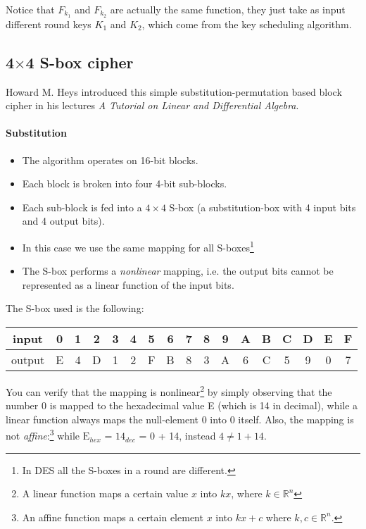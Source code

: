 \documentclass{article}
\begin{document}
  Notice that $F_{k_{1}}$ and $F_{k_{2}}$ are actually the same
  function, they just take as input different round keys $K_{1}$ and
  $K_{2}$, which come from the key scheduling algorithm.
  

  \subsection{4$\times$4 S-box cipher}

  Howard M. Heys introduced this simple substitution-permutation based block 
  cipher in his lectures \emph{A Tutorial on Linear and Differential Algebra}.

  \paragraph{Substitution}
  \begin{itemize}
	\item The algorithm operates on 16-bit blocks.
	\item Each block is broken into four 4-bit sub-blocks.
	\item Each sub-block is fed into a $4\times4$ S-box (a
	  substitution-box with 4 input bits and 4 output bits). 
	\item In this case we use the same mapping for all
	  S-boxes\footnote{In DES all the S-boxes in a round are
	  different.}
	\item The S-box performs a \emph{nonlinear} mapping, i.e. the
	  output bits cannot be represented as a linear function of the
	  input bits.
  \end{itemize}

  The S-box used is the following:
  \begin{center}
	\begin{tabular}{|c|c|c|c|c|c|c|c|c|c|c|c|c|c|c|c|c|}
	  \hline
	  input & 0 & 1 & 2 & 3 & 4 & 5 & 6 & 7 & 8 & 9 & A & B & C & D & E & F \\
	  \hline
	  output & E & 4 & D & 1 & 2 & F & B & 8 & 3 & A & 6 & C & 5 & 9 &
	  0 & 7 \\
	  \hline
	\end{tabular}
  \end{center}

  You can verify that the mapping is nonlinear\footnote{A linear
  function maps a certain value $x$ into $k x$, where
  $k \in \mathbb{R}^{n}$} by simply observing
  that the number 0 is mapped to the hexadecimal value E 
  (which is 14 in decimal), while a linear function always maps the
  null-element 0 into 0 itself.
  Also, the mapping is not \emph{affine}:\footnote{An affine function
  maps a certain element $x$ into $kx+c$ where $k, c \in
  \mathbb{R}^{n}$.} while $\textrm{E}_{hex}$ = $14_{dec}$ = 0 + 14,
  instead $4 \neq 1 + 14$.
\end{document}
